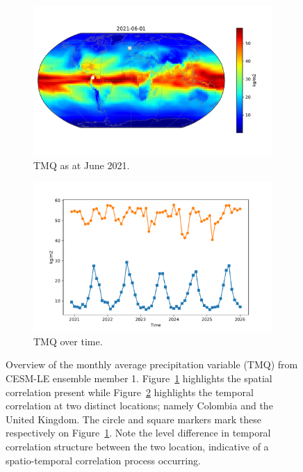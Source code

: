 \begin{figure}[htbp!] 
	\centering
	\begin{subfigure}[b]{0.45\textwidth}
		\includegraphics[width=\textwidth]{TMQ_example}
		\caption{TMQ as at June 2021.}
		\label{fig:precip_june}   
	\end{subfigure}             
	\begin{subfigure}[b]{0.45\textwidth}
		\includegraphics[width=\textwidth]{TMQ_example_temp}
		\caption{TMQ over time.}
		\label{fig:precip_temp}
	\end{subfigure}             
	\caption[Overview of Precipitation variable]{Overview of the monthly average precipitation variable (TMQ) from CESM-LE ensemble member 1. Figure~\ref{fig:precip_june} highlights the spatial correlation present while Figure~\ref{fig:precip_temp} highlights the temporal correlation at two distinct locations; namely Colombia and the United Kingdom. The circle and square markers mark these respectively on Figure~\ref{fig:precip_june}. Note the level difference in temporal correlation structure between the two location, indicative of a spatio-temporal correlation process occurring.}
	\label{fig:precip_overview}
\end{figure}

